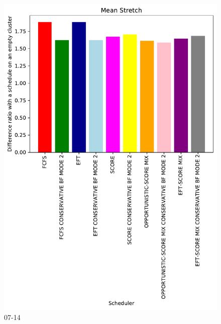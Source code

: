 \documentclass[a4paper]{article}
\begin{document}
\begin{figure}\includegraphics[width=0.9\linewidth]{MBSS/plot/Results_FCFS_Score_Backfill_2022-07-14->2022-07-14_V10000_Mean_Stretch_450_128_32_256_4_1024.pdf}\caption{07-14}\end{figure}
\end{document}
